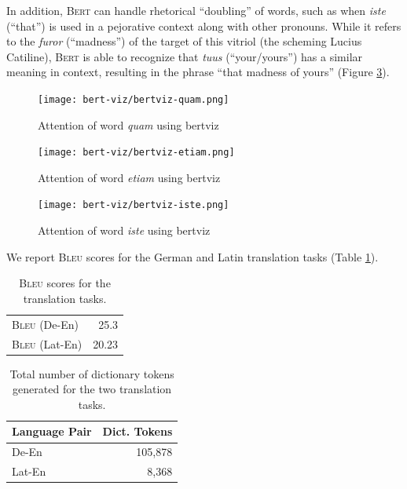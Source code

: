 \documentclass[11pt,a4paper]{article}
\begin{document}
In addition, \textsc{Bert} can handle rhetorical ``doubling'' of words,
such as when \textit{iste} (``that'') is used in a pejorative context along with other pronouns.
While it refers to the \textit{furor} (``madness'') of the target of this vitriol (the scheming Lucius Catiline), 
\textsc{Bert} is able to recognize that \textit{tuus} (``your/yours'') has a similar meaning in context, 
resulting in the phrase ``that madness of yours'' (Figure \ref{fig:iste}).

\begin{figure}
  \texttt{[image: bert-viz/bertviz-quam.png]}
  \caption{Attention of word \textit{quam} using bertviz}
  \label{fig:quam}
\end{figure}

\begin{figure}
  \texttt{[image: bert-viz/bertviz-etiam.png]}
  \caption{Attention of word \textit{etiam} using bertviz}
  \label{fig:etiam}
\end{figure}
\begin{figure}
  \texttt{[image: bert-viz/bertviz-iste.png]}
  \caption{Attention of word \textit{iste} using bertviz}
  \label{fig:iste}
\end{figure}

We report \textsc{Bleu} scores \cite{papineni-etal-2002-bleu} for the German and Latin translation tasks (Table \ref{tbl:bleu}).

\begin{table}
    \centering
    \begin{tabular}{l | r}
    \hline
    \textsc{Bleu} (De-En) & 25.3  \\
    \textsc{Bleu} (Lat-En) & 20.23 \\
    \hline
    \end{tabular}
    \caption{\textsc{Bleu} scores for the translation tasks.}
    \label{tbl:bleu}
\end{table}

\begin{table}[]
    \centering
    \begin{tabular}{l | r}
        \hline
        Language Pair & Dict. Tokens \\
        \hline
        De-En & 105,878 \\
        Lat-En & 8,368 \\
        \hline
    \end{tabular}
    \caption{Total number of dictionary tokens generated for the two translation tasks.}
    \label{tbl:dict}
\end{table}
\end{document}
